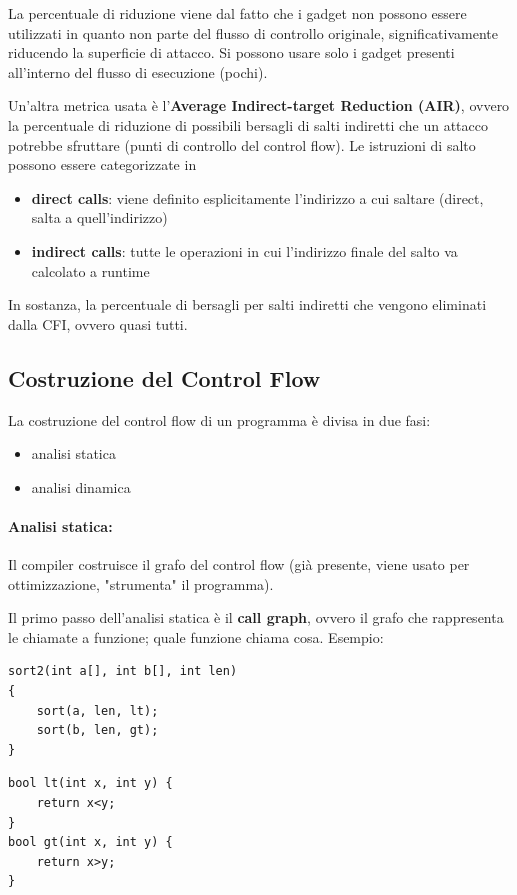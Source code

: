 La percentuale di riduzione viene dal fatto che i gadget non possono essere utilizzati in quanto non parte del flusso di controllo originale, significativamente riducendo la superficie di attacco. Si possono usare solo i gadget presenti all'interno del flusso di esecuzione (pochi).

Un'altra metrica usata è l'\textbf{Average Indirect-target Reduction (AIR)}, ovvero la percentuale di riduzione di possibili bersagli di salti indiretti che un attacco potrebbe sfruttare (punti di controllo del control flow). Le istruzioni di salto possono essere categorizzate in 
\begin{itemize}
	\item \textbf{direct calls}: viene definito esplicitamente l'indirizzo a cui saltare (direct, salta a quell'indirizzo)
    
	\item \textbf{indirect calls}: tutte le operazioni in cui l'indirizzo finale del salto va calcolato a runtime
\end{itemize}
In sostanza, la percentuale di bersagli per salti indiretti che vengono eliminati dalla CFI, ovvero quasi tutti.

\subsection{Costruzione del Control Flow}

La costruzione del control flow di un programma è divisa in due fasi: 
\begin{itemize}
	\item analisi statica
    
	\item analisi dinamica
\end{itemize}

\paragraph{Analisi statica:} Il compiler costruisce il grafo del control flow (già presente, viene usato per ottimizzazione, "strumenta" il programma). 

Il primo passo dell'analisi statica è il \textbf{call graph}, ovvero il grafo che rappresenta le chiamate a funzione; quale funzione chiama cosa. Esempio: 

\begin{center}
	\begin{minipage}[h]{0.52\textwidth}
		\begin{verbatim}
sort2(int a[], int b[], int len)
{
    sort(a, len, lt);
    sort(b, len, gt);
}
		\end{verbatim}
	\end{minipage}
    \hfill 
	\begin{minipage}[h]{0.37\textwidth}
		\begin{verbatim}
bool lt(int x, int y) {
    return x<y;
}
bool gt(int x, int y) {
    return x>y;
}
		\end{verbatim}
	\end{minipage}
\end{center}

